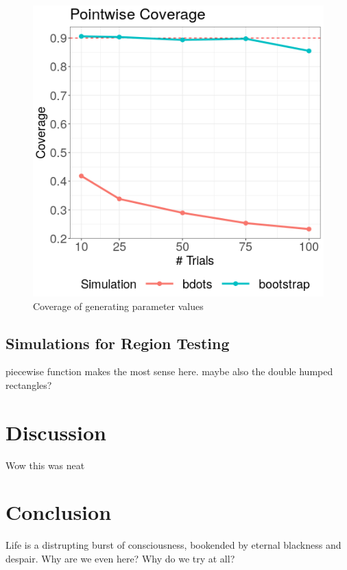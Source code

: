 \documentclass{article}
\begin{document}
\begin{figure}
\centering
\includegraphics[scale=0.5]{img/pointwise_cover.png}
\caption{Coverage of generating parameter values}
\end{figure}


\subsection{Simulations for Region Testing}

piecewise function makes the most sense here. maybe also the double humped rectangles?

\section{Discussion}

Wow this was neat

\section{Conclusion}

Life is a distrupting burst of consciousness, bookended by eternal blackness and despair. Why are we even here? Why do we try at all?
\end{document}
